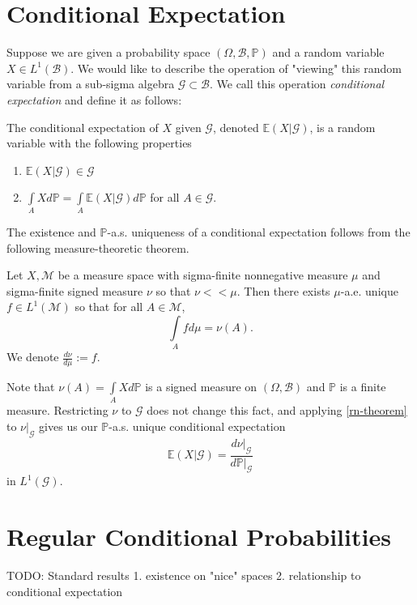 \section{Conditional Expectation}
\label{stoch:cexpe}

Suppose we are given a probability space \((\Omega, \mathcal{B}, \mathbb{P})\) and a random variable \(X \in L^{1}(\mathcal{B})\). We would like to describe the operation of "viewing" this random variable from a sub-sigma algebra \(\mathcal{G} \subset \mathcal{B}\). We call this operation \textit{conditional expectation} and define it as follows:

\begin{definition}
   The conditional expectation of \(X\) given \(\mathcal{G}\), denoted \(\mathbb{E}({X}|{\mathcal{G}})\), is a random variable with the following properties
    \begin{enumerate}
        \item \(\mathbb{E}({X}|{\mathcal{G}}) \in \mathcal{G}\)
        \item \(\int\limits_{A} X d \mathbb{P} = \int\limits_{A} \mathbb{E}({X}|{\mathcal{G}}) d \mathbb{P}\) for all \(A \in \mathcal{G}\).
    \end{enumerate}
\end{definition}

The existence and \(\mathbb{P}\)-a.s. uniqueness of a conditional expectation follows from the following measure-theoretic theorem.

\begin{theorem}
    \label{rn-theorem}
    Let \(X, \mathcal{M}\) be a measure space with sigma-finite nonnegative measure \(\mu\) and sigma-finite signed measure \(\nu\) so that \(\nu << \mu\). Then there exists \(\mu\)-a.e. unique \(f \in L^{1}(\mathcal{M})\) so that for all \(A \in \mathcal{M}\),
    \[\int\limits_{A}f d \mu = \nu(A).\]
    We denote \(\frac{d \nu}{d \mu} := f\).
\end{theorem}

Note that \(\nu(A) = \int\limits_{A} X d \mathbb{P}\) is a signed measure on \((\Omega, \mathcal{B})\) and \(\mathbb{P}\) is a finite measure. Restricting \(\nu\) to \(\mathcal{G}\) does not change this fact, and applying \ref{rn-theorem} to \(\nu{\big|}_{\mathcal{G}}\) gives us our \(\mathbb{P}\)-a.s. unique conditional expectation
\[\mathbb{E}({X}|{\mathcal{G}}) = \frac{d \nu{\big|}_{\mathcal{G}}}{d \mathbb{P}{\big|}_{\mathcal{G}}} \]
in \(L^{1}(\mathcal{G})\).

\section{Regular Conditional Probabilities}

TODO: Standard results
1. existence on "nice" spaces
2. relationship to conditional expectation